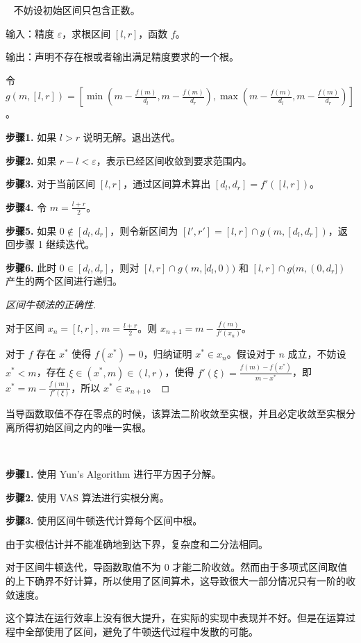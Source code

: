 \begin{algorithm}[区间牛顿法]~
	不妨设初始区间只包含正数。
	
	输入：精度 $\varepsilon$，求根区间 $[l, r]$，函数 $f$。
	
	输出：声明不存在根或者输出满足精度要求的一个根。
	
	令 $g(m, [l, r]) = [\min(m - \frac{f(m)}{d_l}, m - \frac{f(m)}{d_r}), \max(m - \frac{f(m)}{d_l}, m - \frac{f(m)}{d_r})]$。
	
	\textbf{步骤1.} 如果 $l > r$ 说明无解。退出迭代。
	
	\textbf{步骤2.} 如果 $r - l < \varepsilon$，表示已经区间收敛到要求范围内。
	
	\textbf{步骤3.} 对于当前区间 $[l, r]$，通过区间算术算出 $[d_l, d_r] = f'([l, r])$。
	
	\textbf{步骤4.} 令 $m = \frac{l + r}{2}$。
	
	\textbf{步骤5.} 如果 $0 \notin [d_l, d_r]$，则令新区间为 $[l', r'] = [l, r] \cap g(m, [d_l, d_r])$，返回步骤 1 继续迭代。
	
	\textbf{步骤6.} 此时 $0 \in [d_l, d_r]$，则对 $[l, r] \cap g(m, [d_l, 0))$ 和 $[l, r] \cap g(m, (0, d_r])$ 产生的两个区间进行递归。
	
\end{algorithm}

\begin{proof}[区间牛顿法的正确性]~

	对于区间 $x_n = [l, r]$, $m = \frac{l + r}{2}$。则 $x_{n + 1} = m - \frac{f(m)}{f'(x_n)}$。

	对于 $f$ 存在 $x^*$ 使得 $f(x^*) = 0$，归纳证明 $x^* \in x_n$。假设对于 $n$ 成立，不妨设 $x^* < m$，存在 $\xi \in (x^*, m) \in (l, r)$，使得 $f'(\xi) = \frac{f(m) - f(x^*)}{m - x^*}$，即 $x^* = m - \frac{f(m)}{f'(\xi)}$，所以 $x^* \in x_{n + 1}$。



\end{proof}

当导函数取值不存在零点的时候，该算法二阶收敛至实根，并且必定收敛至实根分离所得初始区间之内的唯一实根。

\begin{algorithm}~

	\textbf{步骤1.} 使用 Yun's Algorithm 进行平方因子分解。

	\textbf{步骤2.} 使用 VAS 算法进行实根分离。

	\textbf{步骤3.} 使用区间牛顿迭代计算每个区间中根。


\end{algorithm}

由于实根估计并不能准确地到达下界，复杂度和二分法相同。

对于区间牛顿迭代，导函数取值不为 $0$ 才能二阶收敛。然而由于多项式区间取值的上下确界不好计算，所以使用了区间算术，这导致很大一部分情况只有一阶的收敛速度。

这个算法在运行效率上没有很大提升，在实际的实现中表现并不好。但是在运算过程中全部使用了区间，避免了牛顿迭代过程中发散的可能。
